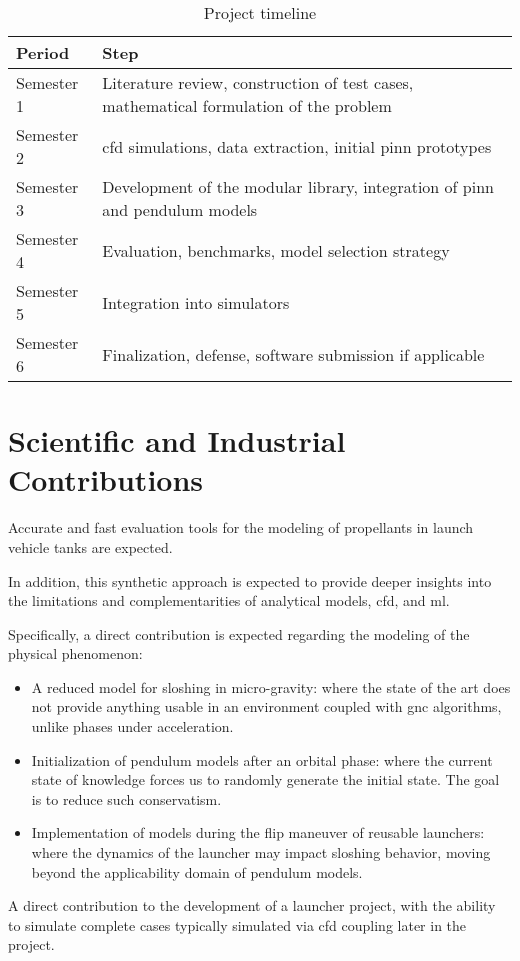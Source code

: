 \documentclass[12pt]{article}
\begin{document}
	\begin{table}[h]
		\centering
		\begin{tabularx}{\textwidth}{l X}
			
			\hline
			
			Period & Step \\
			
			\hline
			
			Semester 1 & Literature review, construction of test cases, mathematical formulation of the problem \\
			Semester 2 & \acrshort{cfd} simulations, data extraction, initial \acrshort{pinn} prototypes \\
			Semester 3 & Development of the modular library, integration of \acrshort{pinn} and pendulum models \\
			Semester 4 & Evaluation, benchmarks, model selection strategy \\
			Semester 5 & Integration into simulators \\
			Semester 6 & Finalization, defense, software submission if applicable \\
			
			\hline
			
		\end{tabularx}
		\caption{Project timeline}
	\end{table}	
	
	\section*{Scientific and Industrial Contributions}
	
	Accurate and fast evaluation tools for the modeling of propellants in launch vehicle tanks are expected.
	
	In addition, this synthetic approach is expected to provide deeper insights into the limitations and complementarities of analytical models, \acrshort{cfd}, and \acrlong{ml}.
	
	Specifically, a direct contribution is expected regarding the modeling of the physical phenomenon:
	\begin{itemize}
		\item A reduced model for sloshing in micro-gravity: where the state of the art does not provide anything usable in an environment coupled with \acrshort{gnc} algorithms, unlike phases under acceleration.
		\item Initialization of pendulum models after an orbital phase: where the current state of knowledge forces us to randomly generate the initial state. The goal is to reduce such conservatism.
		\item Implementation of models during the flip maneuver of reusable launchers: where the dynamics of the launcher may impact sloshing behavior, moving beyond the applicability domain of pendulum models.
	\end{itemize}
	A direct contribution to the development of a launcher project, with the ability to simulate complete cases typically simulated via \acrshort{cfd} coupling later in the project.
	
\end{document}
